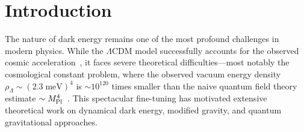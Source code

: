 \documentclass[aps,prd,twocolumn,superscriptaddress,showpacs,preprintnumbers,nofootinbib,longbibliography,floatfix]{revtex4-2}
\newcommand{\MPl}{M_{\rm Pl}}
\begin{document}
\begin{abstract}
The framework accommodates three correlated observational signatures: (1)~galaxy spin dipole asymmetry following a phenomenological $A(z) = A_0(1+z)^{-p}e^{-qz}$, with hierarchical Bayesian fits yielding $A_0 \sim 0.003$ (empirical; a first-principles derivation from $\alpha/M$ faces an order-of-magnitude gap that remains unresolved); (2)~cosmic birefringence (the framework's parity-odd sector is qualitatively consistent with the $2.4$--$2.9\sigma$ Planck/ACT detections, but deriving the rotation angle requires a photon-torsion coupling not yet available); (3)~correlated axes between birefringence anisotropy and galaxy spin dipole. These signatures, if confirmed, would provide distinctive tests of the framework.
\end{abstract}


\maketitle
\tableofcontents


\section{Introduction}\label{sec:intro}

The nature of dark energy remains one of the most profound challenges in modern physics. While the $\Lambda$CDM model successfully accounts for the observed cosmic acceleration~\cite{Planck2018params}, it faces severe theoretical difficulties---most notably the cosmological constant problem, where the observed vacuum energy density $\rho_\Lambda \sim (2.3\;\text{meV})^4$ is $\sim 10^{120}$ times smaller than the naive quantum field theory estimate $\sim \MPl^4$~\cite{Weinberg1989}. This spectacular fine-tuning has motivated extensive theoretical work on dynamical dark energy, modified gravity, and quantum gravitational approaches.
\end{document}
